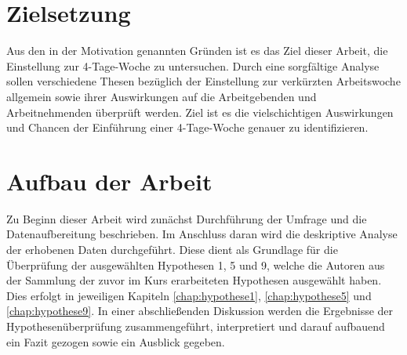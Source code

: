 \section{Zielsetzung}

Aus den in der Motivation genannten Gründen ist es das Ziel dieser Arbeit, die Einstellung zur 4-Tage-Woche
zu untersuchen. Durch eine sorgfältige Analyse sollen verschiedene Thesen bezüglich der Einstellung zur 
verkürzten Arbeitswoche allgemein sowie ihrer Auswirkungen auf die Arbeitgebenden und Arbeitnehmenden 
überprüft werden. Ziel ist es die vielschichtigen Auswirkungen und Chancen der Einführung einer 4-Tage-Woche
genauer zu identifizieren.



\section{Aufbau der Arbeit}

Zu Beginn dieser Arbeit wird zunächst Durchführung der Umfrage und die Datenaufbereitung beschrieben. 
Im Anschluss daran wird die deskriptive Analyse der erhobenen Daten durchgeführt.
Diese dient als Grundlage für die Überprüfung der ausgewählten Hypothesen 1, 5 und 9, welche die Autoren
aus der Sammlung der zuvor im Kurs erarbeiteten Hypothesen ausgewählt haben.
Dies erfolgt in jeweiligen Kapiteln \ref{chap:hypothese1}, \ref{chap:hypothese5} und \ref{chap:hypothese9}.
In einer abschließenden Diskussion werden die Ergebnisse der Hypothesenüberprüfung zusammengeführt, 
interpretiert und darauf aufbauend ein Fazit gezogen sowie ein Ausblick gegeben.



